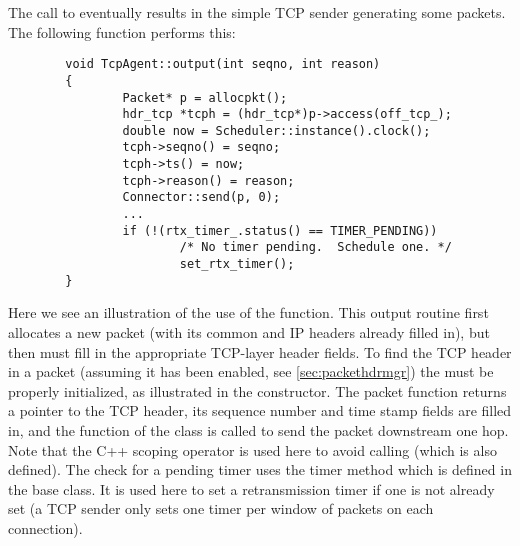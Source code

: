 The call to  eventually results in the simple TCP sender
generating some packets.  The following function 
performs this:
\begin{small}
\begin{verbatim}
        void TcpAgent::output(int seqno, int reason)
        {
                Packet* p = allocpkt();
                hdr_tcp *tcph = (hdr_tcp*)p->access(off_tcp_);
                double now = Scheduler::instance().clock();
                tcph->seqno() = seqno;
                tcph->ts() = now;
                tcph->reason() = reason;
                Connector::send(p, 0);
                ...
                if (!(rtx_timer_.status() == TIMER_PENDING))
                        /* No timer pending.  Schedule one. */
                        set_rtx_timer();
        }
\end{verbatim}
\end{small}
Here we see an illustration of the use of the 
function.
This output routine first allocates a new packet
(with its common and IP headers already filled in), but then must fill
in the appropriate TCP-layer header fields.
To find the TCP header in a packet (assuming it has been enabled, see
\ref{sec:packethdrmgr}) the  must be properly initialized,
as illustrated in the constructor.
The packet  function returns a pointer to the TCP
header, its sequence number and time stamp fields are filled in,
and the  function of the  class is called
to send the packet downstream one hop.
Note that the C++ \code{::} scoping operator is used here to avoid
calling  (which is also defined).
The check for a pending timer uses the timer method  which
is defined in the  base class.
It is used here to set a retransmission timer if one is not already set
(a TCP sender only sets one timer per window of packets on each connection).

\subsection{}

